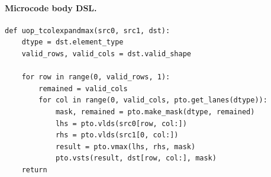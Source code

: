 \paragraph{Microcode body DSL.}
\begin{lstlisting}[style=ptocode]
def uop_tcolexpandmax(src0, src1, dst):
    dtype = dst.element_type
    valid_rows, valid_cols = dst.valid_shape

    for row in range(0, valid_rows, 1):
        remained = valid_cols
        for col in range(0, valid_cols, pto.get_lanes(dtype)):
            mask, remained = pto.make_mask(dtype, remained)
            lhs = pto.vlds(src0[row, col:])
            rhs = pto.vlds(src1[0, col:])
            result = pto.vmax(lhs, rhs, mask)
            pto.vsts(result, dst[row, col:], mask)
    return
\end{lstlisting}
\Needspace{0.34\textheight}
